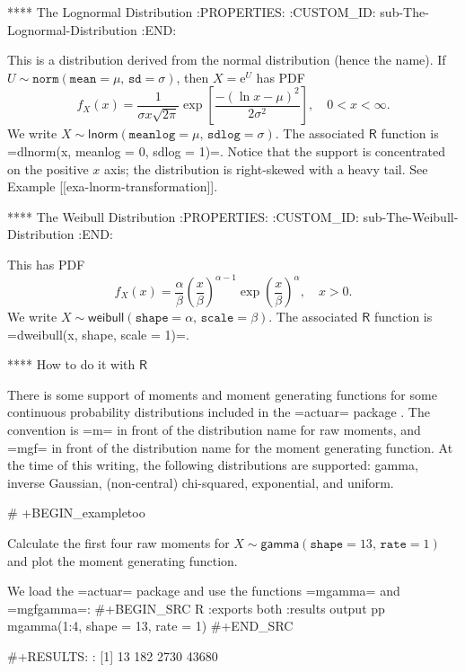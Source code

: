 **** The Lognormal Distribution
:PROPERTIES:
:CUSTOM_ID: sub-The-Lognormal-Distribution
:END:

This is a distribution derived from the normal distribution (hence the
name). If
\(U\sim\mathtt{norm}(\mathtt{mean}=\mu,\,\mathtt{sd}=\sigma)\), then
\( X = \mathrm{e}^{U} \) has PDF
\begin{equation}
f_{X}(x)=\frac{1}{\sigma x\sqrt{2\pi}}\exp\left[\frac{-(\ln x-\mu)^{2}}{2\sigma^{2}}\right], \quad 0 < x < \infty.
\end{equation}
We write
\(X\sim\mathsf{lnorm}(\mathtt{meanlog}=\mu,\,\mathtt{sdlog}=\sigma)\). The
associated \(\mathsf{R}\) function is =dlnorm(x, meanlog = 0, sdlog =
1)=. Notice that the support is concentrated on the positive \(x\)
axis; the distribution is right-skewed with a heavy tail. See Example
[[exa-lnorm-transformation]].

**** The Weibull Distribution
:PROPERTIES:
:CUSTOM_ID: sub-The-Weibull-Distribution
:END:

This has PDF
\begin{equation}
f_{X}(x)=\frac{\alpha}{\beta}\left(\frac{x}{\beta}\right)^{\alpha-1}\exp\left(\frac{x}{\beta}\right)^{\alpha},\quad x>0.
\end{equation}
We write
\(X\sim\mathsf{weibull}(\mathtt{shape}=\alpha,\,\mathtt{scale}=\beta)\). The
associated \(\mathsf{R}\) function is =dweibull(x, shape, scale = 1)=.

**** How to do it with \(\mathsf{R}\)

There is some support of moments and moment generating functions for
some continuous probability distributions included in the =actuar=
package \cite{actuar}. The convention is =m= in front of the
distribution name for raw moments, and =mgf= in front of the
distribution name for the moment generating function. At the time of
this writing, the following distributions are supported: gamma,
inverse Gaussian, (non-central) chi-squared, exponential, and uniform.

# +BEGIN_exampletoo

Calculate the first four raw moments for
\(X\sim\mathsf{gamma}(\mathtt{shape}=13,\,\mathtt{rate}=1)\) and plot
the moment generating function.

We load the =actuar= package and use the functions =mgamma= and
=mgfgamma=:
#+BEGIN_SRC R :exports both :results output pp 
mgamma(1:4, shape = 13, rate = 1)
#+END_SRC

#+RESULTS:
: [1]    13   182  2730 43680

